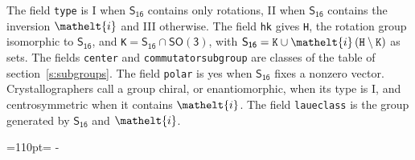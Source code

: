 \documentclass[10pt,a4paper]{article}
\makeatletter
\def\grouprule#1#2{\noalign{\marks\LTgroupmarks{\the\belowrulesep}\nobreak\vskip#1%
  \vskip\aboverulesep}\multispan\LT@cols\unskip{\leaders\hrule\@height#2\hfill\kern\z@}\cr
  \noalign{\penalty\LTrulebreak\vskip\belowrulesep\global\@lastruleclass\z@}}
\newcommand{\needspace}[1]{\par\penalty-100\begingroup\dimen0=#1\relax\dimen2=\pagegoal
  \advance\dimen2-\pagetotal\ifdim\dimen0>\dimen2\relax\ifdim\dimen2>0pt\vfil\break\fi\fi
  \endgroup}
\numberwithin{equation}{section}
\newcommand{\eltfont}[1]{{\let\sigma\eltsigma\mathelt{#1}}}
\newcommand{\grp}[1]{\mathsf{#1}}
\newcommand{\elt}[1]{\eltfont{#1}}
\newcommand{\hmname}[1]{#1}
\newcommand{\orbname}[1]{#1}
\newcommand{\conwayname}[1]{#1}
\newcommand{\igname}[1]{#1}
\newcommand{\olivename}[1]{#1}
\makeatother
\begin{document}
{}
\leavevmode\label{n:element.inversion}The field \texttt{type} is I when $\grp{S_{16}}$ contains only rotations, II when $\grp{S_{16}}$ contains the inversion $\elt{i}$ and III otherwise. The field \texttt{hk} gives \texttt{H}, the rotation group isomorphic to $\grp{S_{16}}$, and \texttt{K}${} = \grp{S_{16}} \cap \grp{SO(3)}$, with $\grp{S_{16}} = \texttt{K} \cup \elt{i}\,(\texttt{H} \setminus \texttt{K})$ as sets. The fields \texttt{center} and \texttt{commutatorsubgroup} are classes of the table of section~\ref{s:subgroups}. The field \texttt{polar} is yes when $\grp{S_{16}}$ fixes a nonzero vector. Crystallographers call a group chiral, or enantiomorphic, when its type is I, and centrosymmetric when it contains $\elt{i}$. The field \texttt{laueclass} is the group generated by $\grp{S_{16}}$ and $\elt{i}$.
\needspace{110pt}
\end{document}
